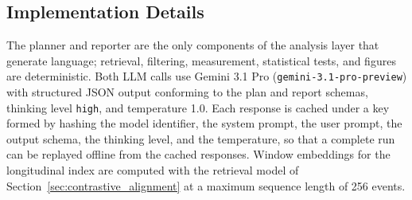 \subsection{Implementation Details}
\label{sec:implementation}

The planner and reporter are the only components of the analysis layer that generate language; retrieval, filtering, measurement, statistical tests, and figures are deterministic. Both LLM calls use Gemini 3.1 Pro (\texttt{gemini-3.1-pro-preview}) with structured JSON output conforming to the plan and report schemas, thinking level \texttt{high}, and temperature 1.0. Each response is cached under a key formed by hashing the model identifier, the system prompt, the user prompt, the output schema, the thinking level, and the temperature, so that a complete run can be replayed offline from the cached responses. Window embeddings for the longitudinal index are computed with the retrieval model of Section~\ref{sec:contrastive_alignment} at a maximum sequence length of 256 events.